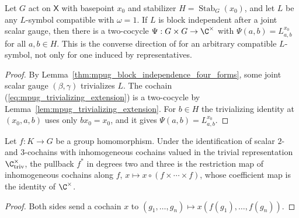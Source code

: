 \begin{lemma}
    \label{lem:mpug_bi_basepoint_extension}
    \leanok
    Let $G$ act on $\mathsf X$ with basepoint $x_0$ and stabilizer
    $H=\operatorname{Stab}_G(x_0)$, and let $L$ be any $L$-symbol compatible
    with $\omega=1$. If $L$ is block independent after a joint scalar gauge,
    then there is a two-cocycle $\Psi:G\times G\to\C^\times$ with
    $\Psi(a,b)=L^{x_0}_{a,b}$ for all $a,b\in H$. This is the converse
    direction of \cite[lines~7057--7064]{FrancoRubio2025MPUGauging} for an
    arbitrary compatible $L$-symbol, not only for one induced by
    representatives.
\end{lemma}
\begin{proof}\leanok
    By Lemma~\ref{thm:mpug_block_independence_four_forms}, some joint scalar
    gauge $(\beta,\gamma)$ trivializes $L$. The cochain
    (\ref{eq:mpug_trivializing_extension}) is a two-cocycle by
    Lemma~\ref{lem:mpug_trivializing_extension}. For $b\in H$ the trivializing
    identity at $(x_0,a,b)$ uses only $bx_0=x_0$, and it gives
    $\Psi(a,b)=L^{x_0}_{a,b}$.
\end{proof}

\begin{lemma}
    \label{lem:mpug_restriction_inhomogeneous}
    \leanok
    Let $f:K\to G$ be a group homomorphism. Under the identification of scalar
    $2$- and $3$-cochains with inhomogeneous cochains valued in the trivial
    representation $\C^\times_{\mathrm{triv}}$, the pullback $f^*$ in degrees
    two and three is the restriction map of inhomogeneous cochains along $f$,
    $x\mapsto x\circ(f\times\cdots\times f)$, whose coefficient map is the
    identity of $\C^\times$.
\end{lemma}
\begin{proof}\leanok
    Both sides send a cochain $x$ to $(g_1,\dots,g_n)\mapsto x(f(g_1),\dots,f(g_n))$.
\end{proof}

